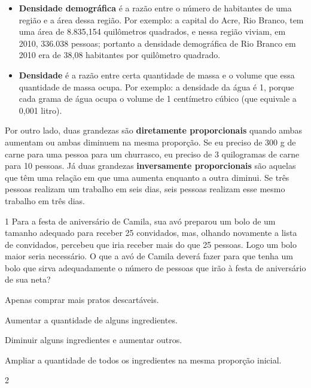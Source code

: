\begin{mdframed}[linewidth=2pt,linecolor=salmao,roundcorner=2pt]
\begin{escolha}
{\begin{escolha}
{\begin{itemize}
  \item \textbf{Densidade demográfica} é a razão entre o número de habitantes de uma região e a área dessa região. Por exemplo: a capital do Acre, Rio Branco, tem uma área de 8.835,154 quilômetros quadrados, e nessa região viviam, em 2010, 336.038 pessoas; portanto a densidade demográfica de Rio Branco em 2010 era de 38,08 habitantes por quilômetro quadrado.

  \item \textbf{Densidade} é a razão entre certa quantidade de massa e o volume que essa quantidade de massa ocupa. Por exemplo: a densidade da água é 1, porque cada grama de água ocupa o volume de 1 centímetro cúbico (que equivale a 0,001 litro).
\end{itemize}

Por outro lado, duas grandezas são \textbf{diretamente proporcionais} quando ambas aumentam ou ambas diminuem na mesma proporção. Se eu preciso de 300 g de carne para uma pessoa para um churrasco, eu preciso de 3 quilogramas de carne para 10 pessoas. Já duas grandezas \textbf{inversamente proporcionais} são aquelas que têm uma relação em que uma aumenta enquanto a outra diminui. Se três pessoas realizam um trabalho em seis dias, seis pessoas realizam esse mesmo trabalho em três dias.
}


\num{1} Para a festa de aniversário de Camila, sua avó preparou um bolo de um
tamanho adequado para receber 25 convidados, mas, olhando novamente a
lista de convidados, percebeu que iria receber mais do que 25 pessoas. Logo um bolo maior seria necessário.
O que a avó de Camila deverá fazer para que tenha um bolo que sirva
adequadamente o número de pessoas que irão à festa de aniversário de sua
neta?

\begin{escolha}
\item
  Apenas comprar mais pratos descartáveis.
\item
  Aumentar a quantidade de alguns ingredientes.
\item
  Diminuir alguns ingredientes e aumentar outros.
\item
  Ampliar a quantidade de todos os ingredientes na mesma proporção
  inicial.
\end{escolha}


\num{2}


\end{escolha}}
\end{escolha}
\end{mdframed}
